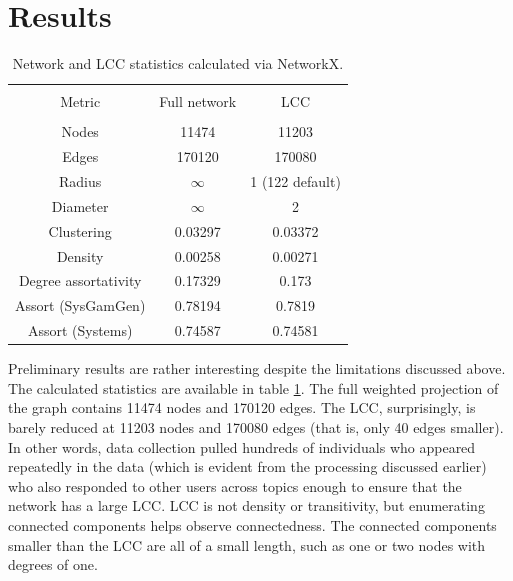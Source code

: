 \documentclass[12pt, a4paper]{article}
\begin{document}
\section{Results}
\begin{table}
\centering
  \begin{tabular} {c c c}
    \hline \\
    Metric & Full network & LCC \\
    \hline \\
    Nodes & 11474 & 11203 \\
    Edges & 170120 & 170080 \\
    Radius & $\infty$ & 1 (122 default) \\
    Diameter & $\infty$ & 2 \\
    Clustering & 0.03297 & 0.03372 \\
    Density & 0.00258 & 0.00271 \\
    Degree assortativity & 0.17329 & 0.173 \\
    Assort (SysGamGen) & 0.78194 & 0.7819 \\
    Assort (Systems) & 0.74587 & 0.74581 \\
    \hline
  \end{tabular}
  \caption{Network and LCC statistics calculated via NetworkX.}
  \label{tab:NetworkStats}
\end{table}

Preliminary results are rather interesting despite the limitations discussed above. The calculated statistics are available in table \ref{tab:NetworkStats}. The full weighted projection of the graph contains 11474 nodes and 170120 edges. The LCC, surprisingly, is barely reduced at 11203 nodes and 170080 edges (that is, only 40 edges smaller). In other words, data collection pulled hundreds of individuals who appeared repeatedly in the data (which is evident from the processing discussed earlier) who also responded to other users across topics enough to ensure that the network has a large LCC. LCC is not density or transitivity, but enumerating connected components helps observe connectedness. The connected components smaller than the LCC are all of a small length, such as one or two nodes with degrees of one.
\end{document}

